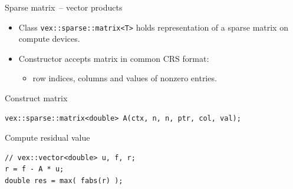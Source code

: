 \documentclass[@BEAMER_OPTIONS@]{beamer}
\newcommand{\code}[1]{\lstinline|#1|}
\begin{document}
\begin{frame}[fragile]{Sparse matrix~-- vector products}
    \begin{itemize}
        \item Class \code{vex::sparse::matrix<T>} holds representation of a
            sparse matrix on compute devices.
        \item Constructor accepts matrix in common CRS format:
            \begin{itemize}
                \item row indices, columns and values of nonzero entries.
            \end{itemize}
    \end{itemize}
    \begin{exampleblock}{Construct matrix}
        \begin{lstlisting}
vex::sparse::matrix<double> A(ctx, n, n, ptr, col, val);
        \end{lstlisting}
    \end{exampleblock}

    \begin{exampleblock}{Compute residual value}
        \begin{lstlisting}[firstnumber=last]
// vex::vector<double> u, f, r;
r = f - A * u;
double res = max( fabs(r) );
        \end{lstlisting}
    \end{exampleblock}
\end{frame}

\end{document}
